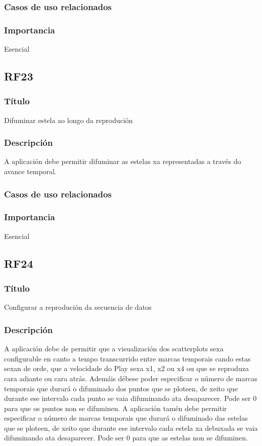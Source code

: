 \subsubsection{Casos de uso relacionados}
\subsubsection{Importancia}
Esencial

\subsection*{RF23}
\subsubsection{Título}
Difuminar estela ao longo da reprodución
\subsubsection{Descripción}
A aplicación debe permitir difuminar as estelas xa representadas a través do avance temporal.
\subsubsection{Casos de uso relacionados}
\subsubsection{Importancia}
Esencial

\subsection*{RF24}
\subsubsection{Título}
Configurar a reprodución da secuencia de datos
\subsubsection{Descripción}
A aplicación debe de permitir que a visualización dos scatterplots sexa configurable en canto a tempo transcurrido entre marcas temporais cando estas sexan de orde, que a velocidade do Play sexa x1, x2 ou x4 ou que se reproduza cara adiante ou cara atrás. Ademáis débese poder especificar o número de marcas temporais que durará o difuminado dos puntos que se ploteen, de xeito que durante ese intervalo cada punto se vaia difuminando ata desaparecer. Pode ser  0 para que os puntos non se difuminen. A aplicación tamén debe permitir especificar o número de marcas temporais que durará o difuminado das estelas que se ploteen, de xeito que durante ese intervalo cada estela xa debuxada se vaia difuminando ata desaparecer. Pode ser 0 para que as estelas non se difuminen.
